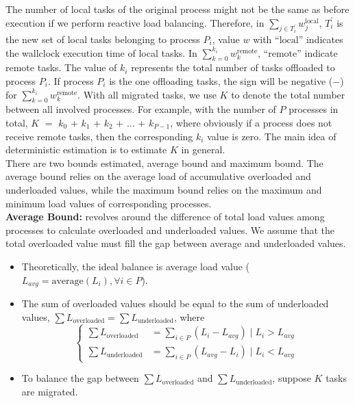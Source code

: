 The number of local tasks of the original process might not be the same as before execution if we perform reactive load balancing. Therefore, in $\sum_{j \in T^{'}_{i}} w_{j}^{\text{local}}$, $T_{i}^{'}$ is the new set of local tasks belonging to process $P_{i}$, value $w$ with ``$\text{local}$'' indicates the wallclock execution time of local tasks. In $\sum_{k=0}^{k_{i}} w_{k}^{\text{remote}}$, ``$\text{remote}$'' indicate remote tasks. The value of $k_{i}$ represents the total number of tasks offloaded to process $P_{i}$. If process $P_{i}$ is the one offloading tasks, the sign will be negative ($-$) for $\sum_{k=0}^{k_{i}} w_{k}^{\text{remote}}$. With all migrated tasks, we use $K$ to denote the total number between all involved processes. For example, with the number of $P$ processes in total, $K$ $=$ $k_{0}$ $+$ $k_{1}$ $+$ $k_{2}$ $+$ $...$ $+$ $k_{P-1}$, where obviously if a process does not receive remote tasks, then the corresponding $k_{i}$ value is zero. The main idea of deterministic estimation is to estimate $K$ in general.\\

There are two bounds estimated, average bound and maximum bound. The average bound relies on the average load of accumulative overloaded and underloaded values, while the maximum bound relies on the maximum and minimum load values of corresponding processes.\\

\noindent \textbf{Average Bound:} revolves around the difference of total load values among processes to calculate overloaded and underloaded values. We assume that the total overloaded value must fill the gap between average and underloaded values.

\begin{itemize}
	\item Theoretically, the ideal balance is average load value ($L_{avg} = \text{average}(L_{i}), \forall i \in P$).
	\item The sum of overloaded values should be equal to the sum of underloaded values, $\sum L_{\text{overloaded}} = \sum L_{\text{underloaded}}$, where
			\begin{equation} \label{eq:L_over_under_load}
				\begin{cases}
					\sum L_{\text{overloaded}}  &= \sum_{i \in P} (L_{i} - L_{avg}) \mid L_{i} > L_{avg} \\
					\sum L_{\text{underloaded}} &= \sum_{i \in P} (L_{avg} - L_{i}) \mid L_{i} < L_{avg}
				\end{cases}
			\end{equation}
	\item To balance the gap between $\sum L_{\text{overloaded}}$ and $\sum L_{\text{underloaded}}$, suppose $K$ tasks are migrated.
\end{itemize}

